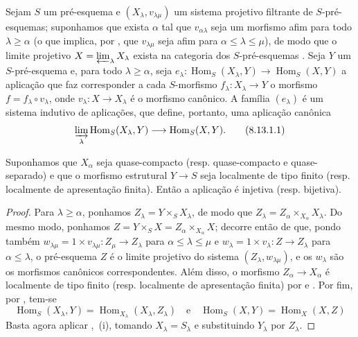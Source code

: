 \begin{proposition}[8.13.1]
\label{IV.8.13.1}
Sejam $S$ um pré-esquema e $(X_\lambda,v_{\lambda\mu})$ um sistema projetivo filtrante de $S$-pré-esquemas; suponhamos que exista $\alpha$ tal que $v_{\alpha\lambda}$ seja um morfismo afim para todo $\lambda\geqslant\alpha$ (o que implica, por , que $v_{\lambda\mu}$ seja afim para $\alpha\leqslant\lambda\leqslant\mu$), de modo que o limite projetivo $X=\varprojlim_\lambda X_\lambda$ exista na categoria dos $S$-pré-esquemas .
Seja $Y$ um $S$-pré-esquema e, para todo $\lambda\geqslant\alpha$, seja $e_\lambda:\operatorname{Hom}_S(X_\lambda,Y)\to\operatorname{Hom}_S(X,Y)$ a aplicação que faz corresponder a cada $S$-morfismo $f_\lambda:X_\lambda\to Y$ o morfismo $f=f_\lambda\circ v_\lambda$, onde $v_\lambda:X\to X_\lambda$ é o morfismo canônico.
A família $(e_\lambda)$ é um sistema indutivo de aplicações, que define, portanto, uma aplicação canônica
\begin{equation}
\label{IV.8.13.1.1}
\varinjlim_\lambda\operatorname{Hom}_S(X_\lambda,Y)\to\operatorname{Hom}_S(X,Y). \tag{8.13.1.1}
\end{equation}

Suponhamos que $X_\alpha$ seja quase-compacto (resp. quase-compacto e quase-separado) e que o morfismo estrutural $Y\to S$ seja localmente de tipo finito (resp. localmente de apresentação finita).
Então a aplicação  é injetiva (resp. bijetiva).
\end{proposition}

\begin{proof}
Para $\lambda\geqslant\alpha$, ponhamos $Z_\lambda=Y\times_S X_\lambda$, de modo que $Z_\lambda=Z_\alpha\times_{X_\alpha}X_\lambda$.
Do mesmo modo, ponhamos $Z=Y\times_S X=Z_\alpha\times_{X_\alpha}X$; decorre então de  que, pondo também $w_{\lambda\mu}=1\times v_{\lambda\mu}:Z_\mu\to Z_\lambda$ para $\alpha\leqslant\lambda\leqslant\mu$ e $w_\lambda=1\times v_\lambda:Z\to Z_\lambda$ para $\alpha\leqslant\lambda$, o pré-esquema $Z$ é o limite projetivo do sistema $(Z_\lambda,w_{\lambda\mu})$, e os $w_\lambda$ são os morfismos canônicos correspondentes.
Além disso, o morfismo $Z_\alpha\to X_\alpha$ é localmente de tipo finito (resp. localmente de apresentação finita) por  e .
Por fim, por , tem-se
\[
\operatorname{Hom}_S(X_\lambda,Y)=\operatorname{Hom}_{X_\lambda}(X_\lambda,Z_\lambda) \quad\text{e}\quad \operatorname{Hom}_S(X,Y)=\operatorname{Hom}_X(X,Z)
\]
Basta agora aplicar ,~(i), tomando $X_\lambda=S_\lambda$ e substituindo $Y_\lambda$ por $Z_\lambda$.
\end{proof}

